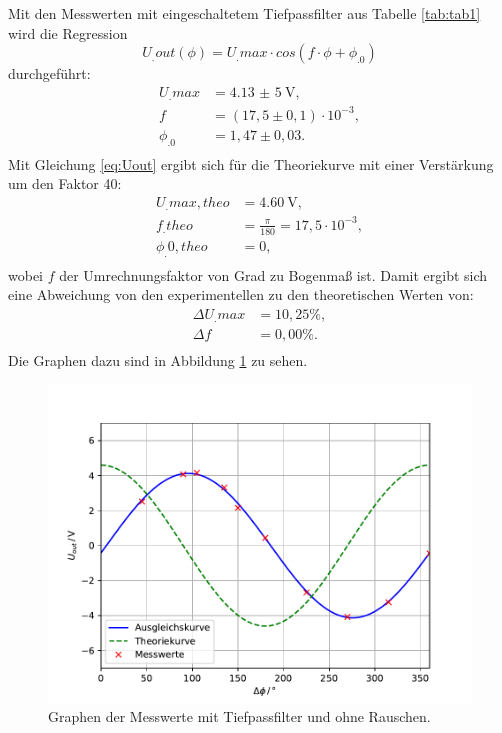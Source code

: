 \noindent Mit den Messwerten mit eingeschaltetem Tiefpassfilter aus Tabelle \ref{tab:tab1} wird die Regression
\begin{equation}
U_.{out}(\phi) = U_.{max}\cdot cos(f\cdot\phi+\phi_.0)\label{eq:Reg}
\end{equation}
durchgeführt:
\begin{align*}
U_.{max} &= \SI{4,13(5)}{\volt}, \\
f 		 &= (17,5\pm0,1)\cdot 10^{-3}, \\
\phi_.0  &= 1,47 \pm0,03 \text{.}\\
\end{align*}
Mit Gleichung \eqref{eq:Uout} ergibt sich für die Theoriekurve mit einer Verstärkung um den Faktor 40:
\begin{align*}
U_.{max,theo} &= \SI{4,60}{\volt}, \\
f_.{theo}	  &= \frac{\pi}{180} = 17,5 \cdot 10^{-3}, \\
\phi_.{0,theo}&= 0, \\
\end{align*}
wobei $f$ der Umrechnungsfaktor von Grad zu Bogenmaß ist.
Damit ergibt sich eine Abweichung von den experimentellen zu den theoretischen Werten von:
\begin{align*}
\Delta U_.{max} &= 10,25\% ,\\
\Delta f		&= 0,00\% \text{.}\\
\end{align*}
Die Graphen dazu sind in Abbildung \ref{fig:U2} zu sehen.

\begin{figure}
\centering
\includegraphics[width=\linewidth-75pt,height=\textheight-75pt,keepaspectratio]{content/images/plot.pdf}
\caption{Graphen der Messwerte mit Tiefpassfilter und ohne Rauschen.}
\label{fig:U2}
\end{figure}



